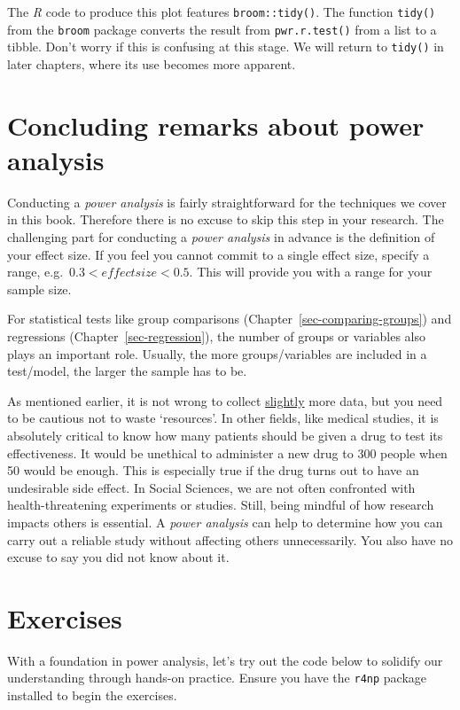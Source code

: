 \documentclass[
  letterpaper,
  DIV=11,
  numbers=noendperiod]{scrreprt}
\begin{document}
The \emph{R} code to produce this plot features \texttt{broom::tidy()}.
The function \texttt{tidy()} from the \texttt{broom} package converts
the result from \texttt{pwr.r.test()} from a list to a tibble. Don't
worry if this is confusing at this stage. We will return to
\texttt{tidy()} in later chapters, where its use becomes more apparent.

\section{Concluding remarks about power
analysis}\label{concluding-remarks-about-power-analysis}

Conducting a \emph{power analysis} is fairly straightforward for the
techniques we cover in this book. Therefore there is no excuse to skip
this step in your research. The challenging part for conducting a
\emph{power analysis} in advance is the definition of your effect size.
If you feel you cannot commit to a single effect size, specify a range,
e.g.~\(0.3 < effect size < 0.5\). This will provide you with a range for
your sample size.

For statistical tests like group comparisons
(Chapter~\ref{sec-comparing-groups}) and regressions
(Chapter~\ref{sec-regression}), the number of groups or variables also
plays an important role. Usually, the more groups/variables are included
in a test/model, the larger the sample has to be.

As mentioned earlier, it is not wrong to collect \ul{slightly} more
data, but you need to be cautious not to waste `resources'. In other
fields, like medical studies, it is absolutely critical to know how many
patients should be given a drug to test its effectiveness. It would be
unethical to administer a new drug to 300 people when 50 would be
enough. This is especially true if the drug turns out to have an
undesirable side effect. In Social Sciences, we are not often confronted
with health-threatening experiments or studies. Still, being mindful of
how research impacts others is essential. A \emph{power analysis} can
help to determine how you can carry out a reliable study without
affecting others unnecessarily. You also have no excuse to say you did
not know about it.

\section{Exercises}\label{sec-exercises-power-analysis}

With a foundation in power analysis, let's try out the code below to
solidify our understanding through hands-on practice. Ensure you have
the \texttt{r4np} package installed to begin the exercises.
\end{document}
